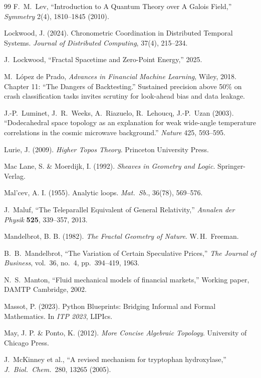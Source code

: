 \begin{thebibliography}{99}
F.~M.~Lev,
``Introduction to A Quantum Theory over A Galois Field,''
\emph{Symmetry} 2(4), 1810--1845 (2010).

 Lockwood, J. (2024). Chronometric Coordination in Distributed Temporal Systems. \emph{Journal of Distributed Computing}, 37(4), 215--234.

J.~Lockwood,
``Fractal Spacetime and Zero-Point Energy,'' 2025.

M.~L\'{o}pez de Prado,
\emph{Advances in Financial Machine Learning},
Wiley, 2018.
Chapter 11: ``The Dangers of Backtesting.'' Sustained precision above 50\% on crash classification tasks invites scrutiny for look-ahead bias and data leakage.

J.-P.~Luminet, J.~R.~Weeks, A.~Riazuelo, R.~Lehoucq, J.-P.~Uzan (2003).
``Dodecahedral space topology as an explanation for weak wide-angle temperature correlations in the cosmic microwave background.''
\textit{Nature} 425, 593--595.

 Lurie, J. (2009). \emph{Higher Topos Theory}. Princeton University Press.

 Mac Lane, S. \& Moerdijk, I. (1992). \emph{Sheaves in Geometry and Logic}. Springer-Verlag.

 Mal'cev, A. I. (1955). Analytic loops. \emph{Mat.\ Sb.}, 36(78), 569--576.

J.~Maluf, ``The Teleparallel Equivalent of General Relativity,'' \emph{Annalen der Physik} \textbf{525}, 339--357, 2013.

 Mandelbrot, B. B. (1982). \emph{The Fractal Geometry of Nature}. W.\,H.\ Freeman.

B.~B.~Mandelbrot,
``The Variation of Certain Speculative Prices,''
\emph{The Journal of Business}, vol.~36, no.~4, pp.~394--419, 1963.

N.~S.~Manton,
``Fluid mechanical models of financial markets,''
Working paper, DAMTP Cambridge, 2002.

 Massot, P. (2023). Python Blueprints: Bridging Informal and Formal Mathematics. In \emph{ITP 2023}, LIPIcs.

 May, J. P. \& Ponto, K. (2012). \emph{More Concise Algebraic Topology}. University of Chicago Press.

 J.~McKinney et al., ``A revised mechanism for tryptophan hydroxylase,'' \emph{J.~Biol.~Chem.}\ 280, 13265 (2005).


\end{thebibliography}
